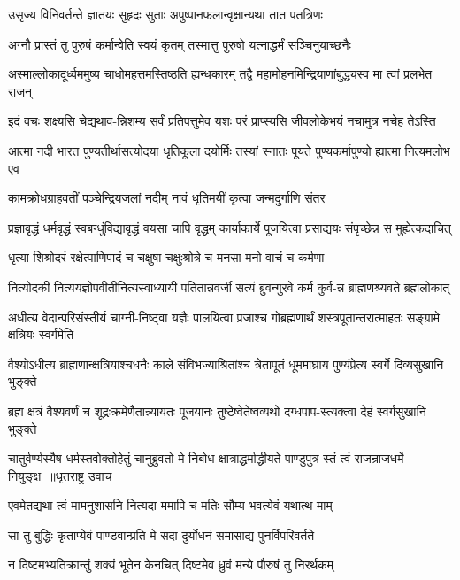 \twolineshloka
{उसृज्य विनिवर्तन्ते ज्ञातयः सुहृदः सुताः}
{अपुष्पानफलान्वृक्षान्यथा तात पतत्रिणः}


\twolineshloka
{अग्नौ प्रास्तं तु पुरुषं कर्मान्वेति स्वयं कृतम्}
{तस्मात्तु पुरुषो यत्नाद्धर्मं सञ्चिनुयाच्छनैः}


\twolineshloka
{अस्माल्लोकादूर्ध्वममुष्य चाधोमहत्तमस्तिष्ठति ह्यन्धकारम्}
{तद्वै महामोहनमिन्द्रियाणांबुद्ध्यस्व मा त्वां प्रलभेत राजन्}


\twolineshloka
{इदं वचः शक्ष्यसि चेद्यथाव-न्निशम्य सर्वं प्रतिपत्तुमेव}
{यशः परं प्राप्स्यसि जीवलोकेभयं नचामुत्र नचेह तेऽस्ति}


\twolineshloka
{आत्मा नदी भारत पुण्यतीर्थासत्योदया धृतिकूला दयोर्मिः}
{तस्यां स्नातः पूयते पुण्यकर्मापुण्यो ह्यात्मा नित्यमलोभ एव}


\twolineshloka
{कामक्रोधग्राहवतीं पञ्चेन्द्रियजलां नदीम्}
{नावं धृतिमयीं कृत्वा जन्मदुर्गाणि संतर}


\twolineshloka
{प्रज्ञावृद्धं धर्मवृद्धं स्वबन्धुंविद्यावृद्धं वयसा चापि वृद्धम्}
{कार्याकार्ये पूजयित्वा प्रसाद्ययः संपृच्छेन्न स मुह्येत्कदाचित्}


\twolineshloka
{धृत्या शिश्रोदरं रक्षेत्पाणिपादं च चक्षुषा}
{चक्षुःश्रोत्रे च मनसा मनो वाचं च कर्मणा}


\twolineshloka
{नित्योदकी नित्ययज्ञोपवीतीनित्यस्वाध्यायी पतितान्नवर्जी}
{सत्यं ब्रुवन्गुरवे कर्म कुर्व-न्न ब्राह्मणश्र्यवते ब्रह्मलोकात्}


\twolineshloka
{अधीत्य वेदान्परिसंस्तीर्य चाग्नी-निष्ट्वा यज्ञैः पालयित्वा प्रजाश्च}
{गोब्रह्मणार्थं शस्त्रपूतान्तरात्माहतः सङ्ग्रामे क्षत्रियः स्वर्गमेति}


\twolineshloka
{वैश्योऽधीत्य ब्राह्मणान्क्षत्रियांश्चधनैः काले संविभज्याश्रितांश्च}
{त्रेतापूतं धूममाघ्राय पुण्यंप्रेत्य स्वर्गे दिव्यसुखानि भुङ्क्ते}


\twolineshloka
{ब्रह्म क्षत्रं वैश्यवर्णं च शूद्रःक्रमेणैतान्न्यायतः पूजयानः}
{तुष्टेष्वेतेष्वव्यथो दग्धपाप-स्त्यक्त्वा देहं स्वर्गसुखानि भुङ्क्ते}


\threelineshloka
{चातुर्वर्ण्यस्यैष धर्मस्तवोक्तोहेतुं चानुब्रुवतो मे निबोध}
{क्षात्राद्धर्माद्धीयते पाण्डुपुत्र-स्तं त्वं राजन्राजधर्मे नियुङ्क्ष ॥धृतराष्ट्र उवाच}
{}


\twolineshloka
{एवमेतद्यथा त्वं मामनुशासनि नित्यदा}
{ममापि च मतिः सौम्य भवत्येवं यथात्थ माम्}


\twolineshloka
{सा तु बुद्धिः कृताप्येवं पाण्डवान्प्रति मे सदा}
{दुर्योधनं समासाद्य पुनर्विपरिवर्तते}


\twolineshloka
{न दिष्टमभ्यतिक्रान्तुं शक्यं भूतेन केनचित्}
{दिष्टमेव ध्रुवं मन्ये पौरुषं तु निरर्थकम्}



